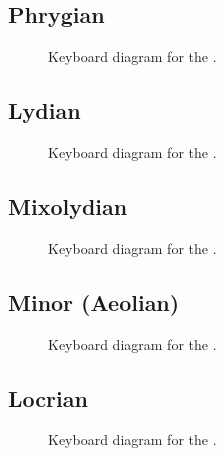 \documentclass[letterpaper,10pt,english]{sphinxmanual}
\begin{document}
\subsection{Phrygian}
\label{\detokenize{index:phrygian}}
\begin{figure}[htbp]
\centering
\capstart

\noindent{}
\caption{Keyboard diagram for the .}\label{\detokenize{index:id16}}\end{figure}


\subsection{Lydian}
\label{\detokenize{index:lydian}}
\begin{figure}[htbp]
\centering
\capstart

\noindent{}
\caption{Keyboard diagram for the .}\label{\detokenize{index:id17}}\end{figure}


\subsection{Mixolydian}
\label{\detokenize{index:mixolydian}}
\begin{figure}[htbp]
\centering
\capstart

\noindent{}
\caption{Keyboard diagram for the .}\label{\detokenize{index:id18}}\end{figure}


\subsection{Minor (Aeolian)}
\label{\detokenize{index:minor-aeolian}}
\begin{figure}[htbp]
\centering
\capstart

\noindent{}
\caption{Keyboard diagram for the .}\label{\detokenize{index:id19}}\end{figure}


\subsection{Locrian}
\label{\detokenize{index:locrian}}
\begin{figure}[htbp]
\centering
\capstart

\noindent{}
\caption{Keyboard diagram for the .}\label{\detokenize{index:id20}}\end{figure}
\end{document}

